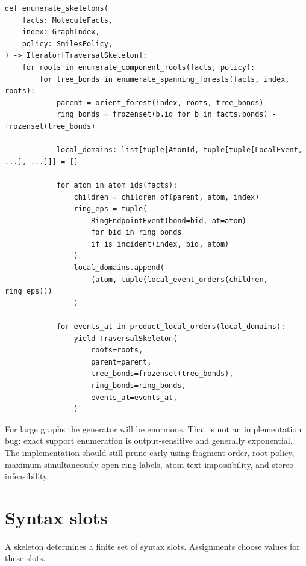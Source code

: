 \documentclass[10pt,a4paper]{article}
\theoremstyle{definition}
\theoremstyle{remark}
\begin{document}
\begin{lstlisting}
def enumerate_skeletons(
    facts: MoleculeFacts,
    index: GraphIndex,
    policy: SmilesPolicy,
) -> Iterator[TraversalSkeleton]:
    for roots in enumerate_component_roots(facts, policy):
        for tree_bonds in enumerate_spanning_forests(facts, index, roots):
            parent = orient_forest(index, roots, tree_bonds)
            ring_bonds = frozenset(b.id for b in facts.bonds) - frozenset(tree_bonds)

            local_domains: list[tuple[AtomId, tuple[tuple[LocalEvent, ...], ...]]] = []

            for atom in atom_ids(facts):
                children = children_of(parent, atom, index)
                ring_eps = tuple(
                    RingEndpointEvent(bond=bid, at=atom)
                    for bid in ring_bonds
                    if is_incident(index, bid, atom)
                )
                local_domains.append(
                    (atom, tuple(local_event_orders(children, ring_eps)))
                )

            for events_at in product_local_orders(local_domains):
                yield TraversalSkeleton(
                    roots=roots,
                    parent=parent,
                    tree_bonds=frozenset(tree_bonds),
                    ring_bonds=ring_bonds,
                    events_at=events_at,
                )
\end{lstlisting}

For large graphs the generator will be enormous.  That is not an implementation
bug: exact support enumeration is output-sensitive and generally exponential.
The implementation should still prune early using fragment order, root policy,
maximum simultaneously open ring labels, atom-text impossibility, and stereo
infeasibility.

\section{Syntax slots}
\label{s:slots}

A skeleton determines a finite set of syntax slots.  Assignments choose values
for these slots.
\end{document}
